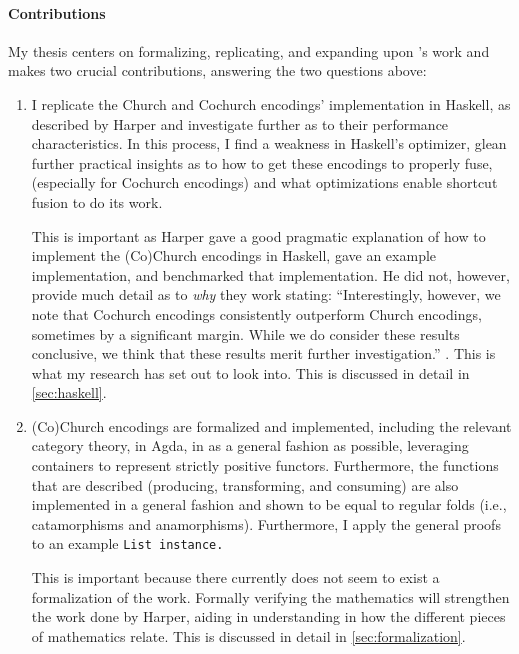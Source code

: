 \paragraph{Contributions}
My thesis centers on formalizing, replicating, and expanding upon \cite{Harper2011}'s work and makes two crucial contributions, answering the two questions above:
\begin{enumerate}
    \item I replicate the Church and Cochurch encodings' implementation in Haskell, as described by Harper and investigate further as to their performance characteristics.
    In this process, I find a weakness in Haskell's optimizer, glean further practical insights as to how to get these encodings to properly fuse, (especially for Cochurch encodings) and what optimizations enable shortcut fusion to do its work.

    This is important as Harper gave a good pragmatic explanation of how to implement the (Co)Church encodings in Haskell, gave an example implementation, and benchmarked that implementation.
    He did not, however, provide much detail as to \textit{why} they work stating: ``Interestingly, however, we note that Cochurch encodings consistently outperform Church encodings, sometimes by a significant margin. While we do consider these results conclusive, we think that these results merit further investigation.'' \citep{Harper2011}.
    This is what my research has set out to look into.
    This is discussed in detail in \autoref{sec:haskell}.
    \item (Co)Church encodings are formalized and implemented, including the relevant category theory, in Agda, in as a general fashion as possible, leveraging containers \citep{Abbott2005} to represent strictly positive functors.
    Furthermore, the functions that are described (producing, transforming, and consuming) are also implemented in a general fashion and shown to be equal to regular folds (i.e., catamorphisms and anamorphisms).
    Furthermore, I apply the general proofs to an example \tt{List} instance.

    This is important because there currently does not seem to exist a formalization of the work.
    Formally verifying the mathematics will strengthen the work done by Harper, aiding in understanding in how the different pieces of mathematics relate.
    This is discussed in detail in \autoref{sec:formalization}.
\end{enumerate}


